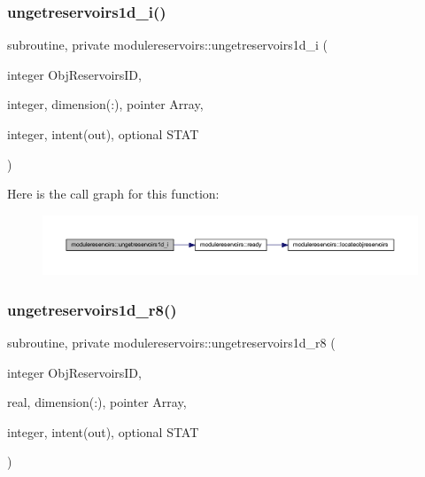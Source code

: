 \subsubsection{\texorpdfstring{ungetreservoirs1d\+\_\+i()}{ungetreservoirs1d\_i()}}
{\footnotesize\ttfamily subroutine, private modulereservoirs\+::ungetreservoirs1d\+\_\+i (\begin{DoxyParamCaption}\item[{integer}]{Obj\+Reservoirs\+ID,  }\item[{integer, dimension(\+:), pointer}]{Array,  }\item[{integer, intent(out), optional}]{S\+T\+AT }\end{DoxyParamCaption})\hspace{0.3cm}{\ttfamily [private]}}

Here is the call graph for this function\+:\nopagebreak
\begin{figure}[H]
\begin{center}
\leavevmode
\includegraphics[width=350pt]{namespacemodulereservoirs_aef049b96a145e57423b0b2da90a0a934_cgraph}
\end{center}
\end{figure}
\mbox{\label{namespacemodulereservoirs_abf51c8915a730bb078066132f1085b94}} 
\subsubsection{\texorpdfstring{ungetreservoirs1d\+\_\+r8()}{ungetreservoirs1d\_r8()}}
{\footnotesize\ttfamily subroutine, private modulereservoirs\+::ungetreservoirs1d\+\_\+r8 (\begin{DoxyParamCaption}\item[{integer}]{Obj\+Reservoirs\+ID,  }\item[{real, dimension(\+:), pointer}]{Array,  }\item[{integer, intent(out), optional}]{S\+T\+AT }\end{DoxyParamCaption})\hspace{0.3cm}{\ttfamily [private]}}

